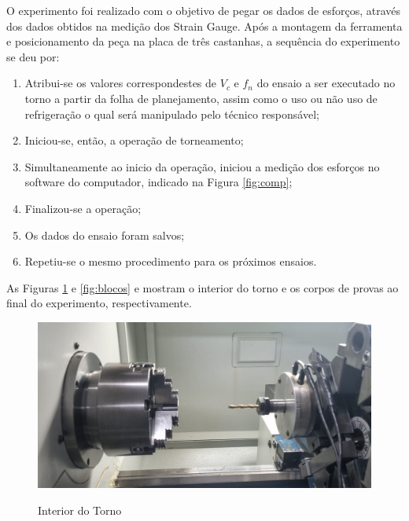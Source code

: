 \documentclass[deposito, acronym, symbols]{fei}
\begin{document}
O experimento foi realizado com o objetivo de pegar os dados de esforços, através dos dados obtidos na medição dos Strain Gauge. Após a montagem da ferramenta e posicionamento da peça na placa de três castanhas, a sequência do experimento se deu por: 

\begin{enumerate}
    \item Atribui-se os valores correspondestes de $V_c$ e $f_n$ do ensaio a ser executado no torno a partir da folha de planejamento, assim como o uso ou não uso de refrigeração o qual será manipulado pelo técnico responsável;
    \item Iniciou-se, então, a operação de torneamento;
    \item Simultaneamente ao inicio da operação, iniciou a medição dos esforços no software do computador, indicado na Figura \ref{fig:comp};
    \item Finalizou-se a operação;
    \item Os dados do ensaio foram salvos;
    \item Repetiu-se o mesmo procedimento para os próximos ensaios.
\end{enumerate}

As Figuras \ref{fig:exp} e \ref{fig:blocos} e  mostram o interior do torno e os corpos de provas ao final do experimento, respectivamente.

\begin{figure}[!htp]
    \centering
    \caption{Interior do Torno}
    \includegraphics[width=0.8\linewidth]{Imagens/Exp04_interior.jpeg}
    \label{fig:exp}
\end{figure}
\end{document}
